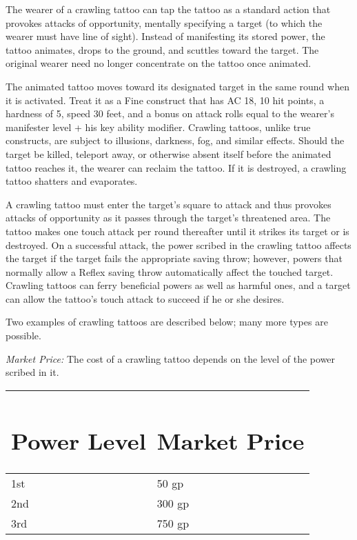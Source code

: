 \documentclass{article}
\begin{document}
The wearer of a crawling tattoo can tap the tattoo as a standard action that provokes 
attacks of opportunity, mentally specifying a target (to which the wearer must 
have line of sight). Instead of manifesting its stored power, the tattoo animates, 
drops to the ground, and scuttles toward the target. The original wearer need no 
longer concentrate on the tattoo once animated.

The animated tattoo moves toward its designated target in the same round when it 
is activated. Treat it as a Fine construct that has AC 18, 10 hit points, a hardness 
of 5, speed 30 feet, and a bonus on attack rolls equal to the wearer's manifester 
level + his key ability modifier. Crawling tattoos, unlike true constructs, are 
subject to illusions, darkness, fog, and similar effects. Should the target be 
killed, teleport away, or otherwise absent itself before the animated tattoo reaches 
it, the wearer can reclaim the tattoo. If it is destroyed, a crawling tattoo shatters 
and evaporates.

A crawling tattoo must enter the target's square to attack and thus provokes attacks 
of opportunity as it passes through the target's threatened area. The tattoo makes 
one touch attack  per round thereafter until it strikes its target or is destroyed. 
On a successful attack, the power scribed in the crawling tattoo affects the target 
if the target fails the appropriate saving throw; however, powers that normally 
allow a Reflex saving throw automatically affect the touched target. Crawling tattoos 
can ferry beneficial powers as well as harmful ones, and a target can allow the 
tattoo's touch attack to succeed if he or she desires.

Two examples of crawling tattoos are described below; many more types are possible.

\textit{Market Price: }The cost of a crawling tattoo depends on the level of the 
power scribed in it.

\begin{tabular}{|>{\raggedright}p{51pt}|>{\raggedright}p{55pt}|}
\hline
\section*{P\textbf{ower Level}} & \section*{M\textbf{arket Price}}\tabularnewline
\hline
1st & 50 gp\tabularnewline
\hline
2nd & 300 gp\tabularnewline
\hline
3rd & 750 gp\tabularnewline
\hline
\end{tabular}
\end{document}
